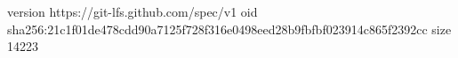 version https://git-lfs.github.com/spec/v1
oid sha256:21c1f01de478cdd90a7125f728f316e0498eed28b9fbfbf023914c865f2392cc
size 14223
